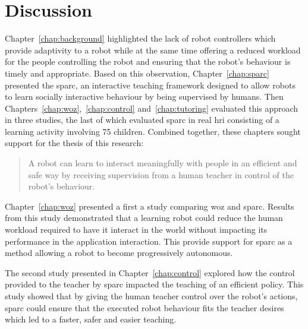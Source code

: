 \chapter{Discussion} \label{chap:discussion}
\glsresetall

Chapter~\ref{chap:background} highlighted the lack of robot controllers which provide adaptivity to a robot while at the same time offering a reduced workload for the people controlling the robot and ensuring that the robot's behaviour is timely and appropriate. Based on this observation, Chapter~\ref{chap:sparc} presented the \gls{sparc}, an interactive teaching framework designed to allow robots to learn socially interactive behaviour by being supervised by humans. Then Chapters~\ref{chap:woz},~\ref{chap:control} and~\ref{chap:tutoring} evaluated this approach in three studies, the last of which evaluated \gls{sparc} in real \gls{hri} consisting of a learning activity involving 75 children. Combined together, these chapters sought support for the thesis of this research:

\begin{quote}
	A robot can learn to interact meaningfully with people in an efficient and safe way by receiving supervision from a human teacher in control of the robot's behaviour.
\end{quote}

Chapter~\ref{chap:woz} presented a first a study comparing \gls{woz} and \gls{sparc}. Results from this study demonstrated that a learning robot could reduce the human workload required to have it interact in the world without impacting its performance in the application interaction. This provide support for \gls{sparc} as a method allowing a robot to become progressively autonomous. 

The second study presented in Chapter~\ref{chap:control} explored how the control provided to the teacher by \gls{sparc} impacted the teaching of an efficient policy. This study showed that by giving the human teacher control over the robot's actions, \gls{sparc} could ensure that the executed robot behaviour fits the teacher desires which led to a faster, safer and easier teaching. 


